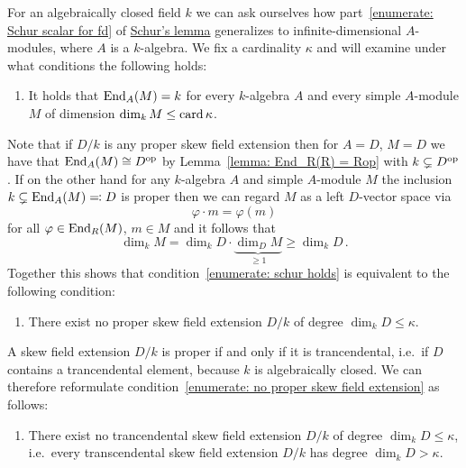 

\begin{remark}
  \label{remark: Schur for cardinality big enough}
  For an algebraically closed field $k$ we can ask ourselves how part~\ref*{enumerate: Schur scalar for fd} of \hyperref[proposition: schurs lemma for modules]{Schur’s lemma} generalizes to infinite-dimensional $A$-modules, where $A$ is a $k$-algebra.
  We fix a cardinality $\kappa$ and will examine under what conditions the following holds:
  \begin{enumerate}
    \item
      \label{enumerate: schur holds}
      It holds that $\operatorname{End}_A(M) = k$ for every $k$-algebra $A$ and every simple $A$-module $M$ of dimension $\dim_k M \leq \operatorname{card} \kappa$.
  \end{enumerate}
  
  Note that if $D/k$ is any proper skew field extension then for $A = D$, $M = D$ we have that $\operatorname{End}_A(M) \cong D^{\operatorname{op}}$ by Lemma~\ref{lemma: End_R(R) = Rop} with $k \subsetneq D^{\operatorname{op}}$.
  If on the other hand for any $k$-algebra $A$ and simple $A$-module $M$ the inclusion $k \subsetneq \operatorname{End}_A(M) \eqqcolon D$ is proper then we can regard $M$ as a left $D$-vector space via
  \[
      \varphi \cdot m
    = \varphi(m)
  \]
  for all $\varphi \in \operatorname{End}_R(M)$, $m \in M$ and it follows that
  \[
          \dim_k M
    =     \dim_k D \cdot \underbrace{\dim_D M}_{\geq 1}
    \geq  \dim_k D \,.
  \]
  Together this shows that condition~\ref*{enumerate: schur holds} is equivalent to the following condition:
  \begin{enumerate}[resume]
    \item 
      \label{enumerate: no proper skew field extension}
      There exist no proper skew field extension $D/k$ of degree $\dim_k D \leq \kappa$.
  \end{enumerate}
  A skew field extension $D/k$ is proper if and only if it is trancendental, i.e.\ if $D$ contains a trancendental element, because $k$ is algebraically closed.
  We can therefore reformulate condition~\ref*{enumerate: no proper skew field extension} as follows:
  \begin{enumerate}[resume]
    \item 
      There exist no trancendental skew field extension $D/k$ of degree $\dim_k D \leq \kappa$, i.e.\ every transcendental skew field extension $D/k$ has degree $\dim_k D > \kappa$.
  \end{enumerate}
  

\end{remark}
